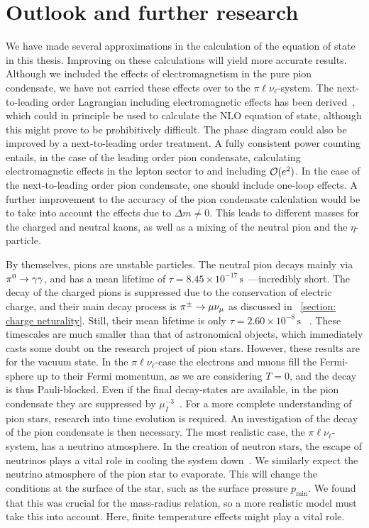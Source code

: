 \section{Outlook and further research}

We have made several approximations in the calculation of the equation of state in this thesis.
Improving on these calculations will yield more accurate results.
Although we included the effects of electromagnetism in the pure pion condensate, we have not carried these effects over to the $\pi\ell\nu_\ell$-system.
The next-to-leading order Lagrangian including electromagnetic effects has been derived~\autocite{urechVirtualPhotonsChiral1995}, which could in principle be used to calculate the NLO equation of state, although this might prove to be prohibitively difficult.
The phase diagram could also be improved by a next-to-leading order treatment.
A fully consistent power counting entails, in the case of the leading order pion condensate, calculating electromagnetic effects in the lepton sector to and including $\mathcal O(e^2)$.
In the case of the next-to-leading order pion condensate, one should include one-loop effects.
A further improvement to the accuracy of the pion condensate calculation would be to take into account the effects due to $\Delta m \neq 0$.
This leads to different masses for the charged and neutral kaons, as well as a mixing of the neutral pion and the $\eta$-particle.


By themselves, pions are unstable particles.
The neutral pion decays mainly via ${\pi^0}\rightarrow \gamma\gamma$, and has a mean lifetime of $\tau = 8.45\times 10^{-17}\,\text{s}$~\autocite{zylaReviewParticlePhysics2020}---incredibly short.
The decay of the charged pions is suppressed due to the conservation of electric charge, and their main decay process is ${\pi^\pm}\rightarrow \mu \nu_\mu$ as discussed in
%
~\autoref{section: charge neturality}.
%
Still, their mean lifetime is only $\tau = 2.60\times 10^{-8}\,\text{s}$
%
~\autocite{zylaReviewParticlePhysics2020}.
%
These timescales are much smaller than that of astronomical objects, which immediately casts some doubt on the research project of pion stars.
However, these results are for the vacuum state.
In the $\pi\ell\nu_\ell$-case the electrons and muons fill the Fermi-sphere up to their Fermi momentum, as we are considering $T = 0$, and the decay is thus Pauli-blocked.
Even if the final decay-states are available, in the pion condensate they are suppressed by $\mu_I^{-3}$~\autocite{brandtNewClassCompact2018}. 
For a more complete understanding of pion stars, research into time evolution is required.
An investigation of the decay of the pion condensate is then necessary.
The most realistic case, the $\pi\ell\nu_\ell$-system, has a neutrino atmosphere.
In the creation of neutron stars, the escape of neutrinos plays a vital role in cooling the system down~\autocite{glendenningCompactStarsNuclear2012}.
We similarly expect the neutrino atmosphere of the pion star to evaporate.
This will change the conditions at the surface of the star, such as the surface pressure $p_\text{min}$.
We found that this was crucial for the mass-radius relation, so a more realistic model must take this into account.
Here, finite temperature effects might play a vital role.


